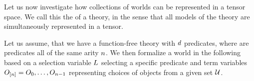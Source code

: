 







%
\sect{\SemanticStructure{}} %

Let us now investigate how collections of worlds can be represented in a tensor space.
We call this the \semanticStructure{} of a \firstOrderLogic{} theory, in the sense that all models of the theory are simultaneously represented in a tensor.

Let us assume, that we have a function-free theory with $d$ predicates, where are predicates all of the same arity $n$.
We then formalize a world in the following based on a selection variable $L$ selecting a specific predicate and term variables $O_{[n]}=O_{0},\ldots,O_{n-1}$ representing choices of objects from a given set $\mathcal{U}$.

